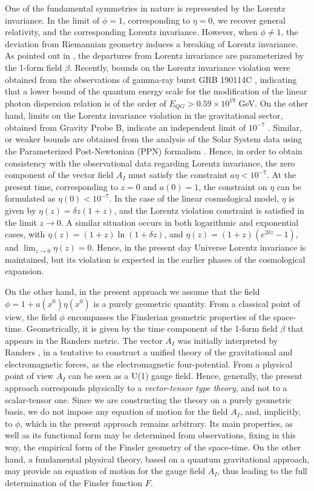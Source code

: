\documentclass[aps,superscriptaddress, showpacs,preprintnumbers, superscriptaddress, nofootinbibt,twocolumn]{revtex4-2}
\begin{document}
 One of the fundamental symmetries in nature is represented by the Lorentz invariance. In the limit of $\phi =1$, corresponding to $\eta =0$, we recover general relativity, and the corresponding Lorentz invariance. However, when $\phi \neq 1$, the deviation from Riemannian geometry induces a breaking of Lorentz invariance. As pointed out in \cite{Fc14}, the departures from Lorentz invariance are parameterized by the 1-form field $\beta$. Recently, bounds on the Lorentz invariance violation were obtained from the observations of gamma-ray burst GRB 190114C \cite{magic}, indicating that a lower bound of the quantum energy scale for the modification of the linear photon dispersion relation is of the order of $E_{QG}>0.59\times 10^{19}$ GeV. On the other hand, limits on the Lorentz invariance violation in the gravitational sector, obtained from Gravity Probe B, indicate an independent limit of $10^{-7}$ \cite{ProbeB}. Similar, or weaker bounds are obtained from the  analysis of the Solar System data using the Parameterized Post-Newtonian (PPN) formalism \cite{Will}. Hence, in order to obtain consistency with the observational data regarding Lorentz invariance, the zero component of the vector field $A_I$ must satisfy the constraint $a\eta <10^{-7}$. At the present time, corresponding to $z=0$ and $a(0)=1$, the constraint on $\eta$ can be formulated as $\eta (0)<10^{-7}$. In the case of the linear cosmological model, $\eta$ is given by $\eta(z)=\delta z\left(1+z\right)$, and the Lorentz violation constraint is satisfied in the limit $z\rightarrow 0$. A similar situation occurs in both logarithmic and exponential cases, with $\eta (z)=(1+z)\ln (1+\delta z)$, and $\eta (z)=(1+z)\left(e^{2\delta z}-1\right)$, and $\lim_{z\rightarrow 0}\eta (z)=0$. Hence, in the present day Universe Lorentz invariance is maintained, but its violation is expected in the earlier phases of the cosmological expansion.

 On the other hand, in the present approach we assume that the field $\phi=1+a\left(x^0\right)\eta \left(x^0\right)$ is a purely geometric quantity. From a classical point of view, the field $\phi$ encompasses the Finslerian geometric properties of the space-time. Geometrically, it is given by the time component of the 1-form field $\beta$ that appears in the Randers metric. The vector $A_I$ was initially interpreted by Randers \cite{Rand}, in a tentative to construct a unified theory of the gravitational and electromagnetic forces, as the electromagnetic four-potential. From a physical point of view $A_I$ can be seen as a U(1) gauge field. Hence, generally, the present approach corresponds physically to a {\it vector-tensor type theory}, and not to a scalar-tensor one. Since we are constructing the theory on a purely geometric basis, we do not impose any equation of motion for the field $A_I$, and, implicitly, to $\phi$, which in the present approach remains arbitrary.  Its main properties, as well as its functional form may be determined from observations, fixing in this way, the empirical form of the Finsler geometry of the space-time. On the other hand, a fundamental physical theory, based on a quantum gravitational approach, may provide an equation of motion for the gauge field $A_I$,  thus leading to the full determination of the Finsler function $F$.
\end{document}
